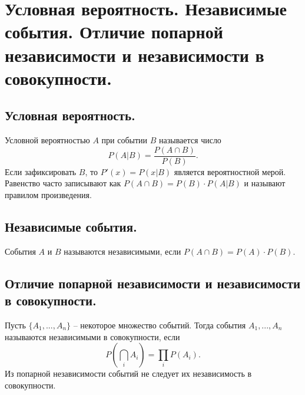 \section{Условная вероятность. Независимые события. Отличие попарной независимости и независимости в совокупности.}

\subsection{Условная вероятность.}
Условной вероятностью $A$ при событии $B$ называется число $$P(A|B) = \frac{P(A \cap B)}{P(B)}.$$
Если зафиксировать $B$, то $P'(x) = P(x | B)$ является вероятностной мерой.
Равенство часто записывают как $P(A \cap B) = P(B) \cdot P(A | B)$ и называют правилом произведения.

\subsection{Независимые события.}
События $A$ и $B$ называются независимыми, если $P(A \cap B) = P(A) \cdot P(B)$.

\subsection{Отличие попарной независимости и независимости в совокупности.}
Пусть $\{A_1, ..., A_n\}$ -- некоторое множество событий. Тогда события $A_1, ..., A_n$ называются независимыми в совокупности, если $$P\left(\bigcap_{i} A_i \right) = \prod_{i} P(A_i).$$
Из попарной независимости событий не следует их независимость в совокупности.
